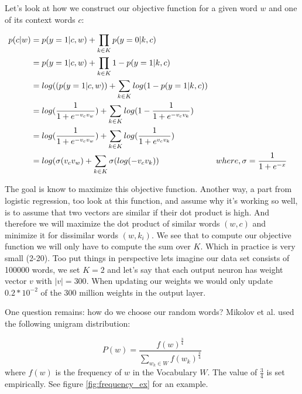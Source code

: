 {Let's look at how we construct our objective function for a given word $w$ and one of its context words $c$: 

\begin{align*} \label{eq:obj_neg_samples}
p(c|w) &= p(y=1|c,w) + \prod_{k\in K} p(y=0|k,c) 
\\&= p(y=1|c,w) + \prod_{k\in K} 1- p(y=1|k,c) 
\\&= log((p(y=1|c,w)) + \sum_{k\in K} log(1- p(y=1|k,c)) 
\\&=  log(\frac{1}{1+e^{-v_c v_w }})  + \sum_{k\in K} log(1-\frac{1}{1+e^{-v_c v_k}}) 
\\&=  log(\frac{1}{1+e^{-v_c v_w }})  + \sum_{k\in K} log(\frac{1}{1+e^{v_c v_k }})
\\&= log(\sigma(v_c v_w ) + \sum_{k\in K} \sigma(log(-v_c v_k )) &&\text{$ where, \sigma = \frac{1}{1+e^{-x}}$}
\end{align*}

The goal is know to maximize this objective function. Another way, a part from logistic regression, too look at this function, and assume why it's working so well, is to assume that two vectors are similar if their dot product is high. And therefore we will maximize the dot product of similar words $(w,c)$ and minimize it for dissimilar words $(w,k_i)$.
We see that to compute our objective function we will only have to compute the sum over $K$. Which in practice is very small (2-20). Too put things in perspective lets imagine our data set consists of 100000 words, we set $K=2$ and let's say that each output neuron has weight vector $v$ with $|v| = 300$. When updating our weights we would only update  $0.2*10^{-2}$ of the 300 million weights in the output layer. 

One question remains: how do we choose our random words? Mikolov et al. \cite{mikolov2} used the following unigram distribution:
 
 \begin{equation} \label{eq:unigram}
P(w)=\frac{f(w)^{\frac{3}{4}}}{\sum_{w_k\in W} f(w_k)^{\frac{3}{4}}}
\end{equation}
where $f(w)$ is the frequency of $w$ in the Vocabulary $W$. The value of $\frac{3}{4}$ is set empirically. See figure \ref{fig:frequency_ex} for an example.

}
